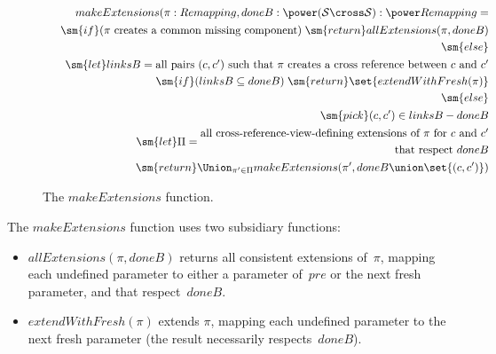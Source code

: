 \begin{figure}[th]
\[
\begin{align}
makeExtensions(\pi: Remapping, doneB: \power(\S \cross \S): 
   \power Remapping =  \\
\quad\begin{align}
  \sm{if}(\mbox{$\pi$ creates a common missing component})
     \; \sm{return } allExtensions(\pi, doneB) \\
  \sm{else}  \\
  \quad\begin{align}
    \sm{let } linksB = \mbox{all pairs $(c,c')$ such that $\pi$ creates a
     cross reference between $c$ and $c'$} \\
    \sm{if}(linksB \subseteq doneB) \; \sm{return } \set{extendWithFresh(\pi)} \\
    \sm{else}  \\
    \quad\begin{align}
      \sm{pick } (c,c') \in linksB - doneB \\
      \sm{let } \Pi = 
        \begin{align}
        \mbox{all cross-reference-view-defining extensions of
           $\pi$ for $c$ and $c'$} \\
        \mbox{that respect $doneB$}
        \end{align} \\
      \sm{return } \Union_{\pi' \in \Pi}
        makeExtensions(\pi', doneB \union \set{(c,c')})
       \end{align}
  \end{align} \\         
  \end{align} \\
\end{align}
\]
\caption{The $makeExtensions$ function.}
\label{fig:makeExtensions}
\end{figure}




The $makeExtensions$ function uses two subsidiary functions:
%
\begin{itemize}
\item 
$allExtensions(\pi, doneB)$ returns all consistent extensions of~$\pi$,
mapping each undefined parameter to either a parameter of~$pre$ or the next
fresh parameter, and that respect~$doneB$.

\item $extendWithFresh(\pi)$ extends $\pi$, mapping each undefined parameter
  to the next fresh parameter (the result necessarily respects~$doneB$).
\end{itemize}
 
